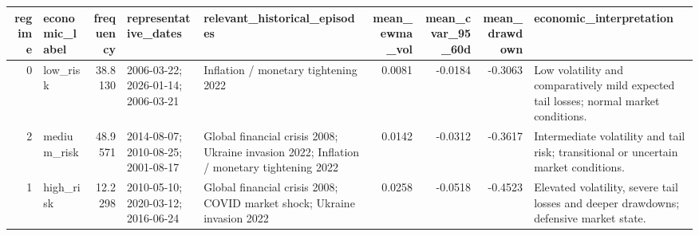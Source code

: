 \begin{tabular}{rlrllrrrl}
\toprule
regime & economic_label & frequency & representative_dates & relevant_historical_episodes & mean_ewma_vol & mean_cvar_95_60d & mean_drawdown & economic_interpretation \\
\midrule
0 & low_risk & 38.8130 & 2006-03-22; 2026-01-14; 2006-03-21 & Inflation / monetary tightening 2022 & 0.0081 & -0.0184 & -0.3063 & Low volatility and comparatively mild expected tail losses; normal market conditions. \\
2 & medium_risk & 48.9571 & 2014-08-07; 2010-08-25; 2001-08-17 & Global financial crisis 2008; Ukraine invasion 2022; Inflation / monetary tightening 2022 & 0.0142 & -0.0312 & -0.3617 & Intermediate volatility and tail risk; transitional or uncertain market conditions. \\
1 & high_risk & 12.2298 & 2010-05-10; 2020-03-12; 2016-06-24 & Global financial crisis 2008; COVID market shock; Ukraine invasion 2022 & 0.0258 & -0.0518 & -0.4523 & Elevated volatility, severe tail losses and deeper drawdowns; defensive market state. \\
\bottomrule
\end{tabular}
